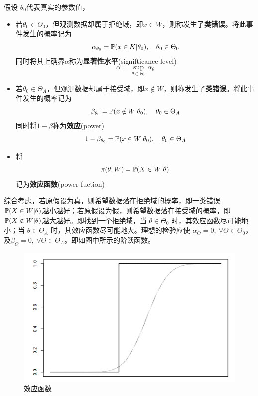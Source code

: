 \begin{definition}
    假设 $\theta_0$代表真实的参数值，
    \begin{itemize}
        \item 若$\theta_0 \in \Theta_0$，但观测数据却属于拒绝域，即$x \in W$，则称发生了\textbf{\uppercase\expandafter{}类错误}。将此事件发生的概率记为
              \[ \alpha_{\theta_0} = \P(x \in K|\theta_0),\quad \theta_0 \in \Theta_0 \]
              同时将其上确界$\alpha$称为\textbf{显著性水平}(signifticance level)
              \[ \alpha = \sup_{\theta \in \Theta_0} \alpha_{\theta} \]
        \item 若$\theta_0 \in \Theta_A$，但观测数据却属于接受域，即$x \notin W$，则称发生了\textbf{\uppercase\expandafter{}类错误}。将此事件发生的概率记为
              \[ \beta_{\theta_0} = \P(x \notin W|\theta_0) ,\quad \theta_0 \in \Theta_A\]
              同时将$1-\beta$称为\textbf{效应}(power)
              \[ 1-\beta_{\theta_0} = \P(x \in W|\theta_0) ,\quad \theta_0 \in \Theta_A \]
        \item 将
              \[ \pi(\theta;W)=\P(X \in W|\theta) \]
              记为\textbf{效应函数}(power fuction)
    \end{itemize}
\end{definition}

综合考虑，若原假设为真，则希望数据落在拒绝域的概率，即一类错误$\P(X \in W|\theta)$越小越好；若原假设为假，则希望数据落在接受域的概率，即$\P(X \notin W|\theta)$越大越好。即找到一个拒绝域，当 $\theta \in \Theta_0$ 时，其效应函数尽可能地小；当 $\theta \in \Theta_A$ 时，其效应函数尽可能地大。理想的检验应使 $\alpha_\Theta = 0 ,\ \forall \Theta \in \Theta_0$，及$\beta_\Theta = 0 ,\ \forall \Theta \in \Theta_A$。即如图中所示的阶跃函数。

\begin{figure}[H]
    \centering
    \includegraphics{figures/power_fuction.png}
    \caption[]{效应函数}
\end{figure}

